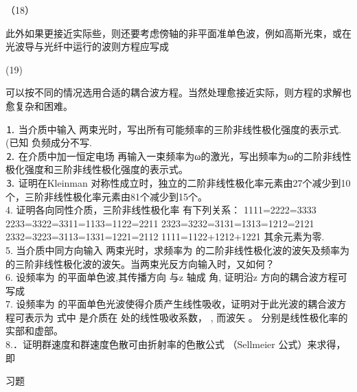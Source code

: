                   （18）

此外如果更接近实际些，则还要考虑傍轴的非平面准单色波，例如高斯光束，或在光波导与光纤中运行的波则方程应写成

                    (19)

可以按不同的情况选用合适的耦合波方程。当然处理愈接近实际，则方程的求解也愈复杂和困难。

\begin{exercise}
⒈  当介质中输入 两束光时，写出所有可能频率的三阶非线性极化强度的表示式.(已知 负频成分不写.\\
⒉  在介质中加一恒定电场  再输入一束频率为ω的激光，写出频率为ω的二阶非线性极化强度和三阶非线性极化强度的表示式。\\
⒊   证明在Kleinman 对称性成立时，独立的二阶非线性极化率元素由27个减少到10个，三阶非线性极化率元素由81个减少到15个。\\
4.   证明各向同性介质，三阶非线性极化率  有下列关系：
      1111=2222=3333
      2233=3322=3311=1133=1122=2211
      2323=3232=3131=1313=1212=2121
      2332=3223=3113=1331=1221=2112
      1111=1122+1212+1221
      其余元素为零. \\
5. 当介质中同方向输入 两束光时，求频率为 的二阶非线性极化波的波矢及频率为 的三阶非线性极化波的波矢。当两束光反方向输入时，又如何？\\
6.  设频率为 的平面单色波,其传播方向 与z 轴成 角, 证明沿z 方向的耦合波方程可写成    \\
7.  设频率为 的平面单色光波使得介质产生线性吸收，证明对于此光波的耦合波方程可表示为      
式中 是介质在 处的线性吸收系数， ,
而波矢 。 分别是线性极化率的实部和虚部。\\
     8.．证明群速度和群速度色散可由折射率的色散公式 （Sellmeier 公式）来求得，即
                             


\end{exercise}
习题

